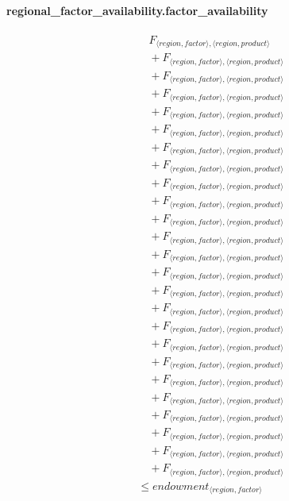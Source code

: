 \documentclass[11pt]{article}
\begin{document}
\paragraph{regional\_factor\_availability.factor\_availability}
\begin{align*}
&\quad F_{\langle region, factor\rangle,\langle region, product\rangle}\\
&\quad {}+ F_{\langle region, factor\rangle,\langle region, product\rangle}\\
&\quad {}+ F_{\langle region, factor\rangle,\langle region, product\rangle}\\
&\quad {}+ F_{\langle region, factor\rangle,\langle region, product\rangle}\\
&\quad {}+ F_{\langle region, factor\rangle,\langle region, product\rangle}\\
&\quad {}+ F_{\langle region, factor\rangle,\langle region, product\rangle}\\
&\quad {}+ F_{\langle region, factor\rangle,\langle region, product\rangle}\\
&\quad {}+ F_{\langle region, factor\rangle,\langle region, product\rangle}\\
&\quad {}+ F_{\langle region, factor\rangle,\langle region, product\rangle}\\
&\quad {}+ F_{\langle region, factor\rangle,\langle region, product\rangle}\\
&\quad {}+ F_{\langle region, factor\rangle,\langle region, product\rangle}\\
&\quad {}+ F_{\langle region, factor\rangle,\langle region, product\rangle}\\
&\quad {}+ F_{\langle region, factor\rangle,\langle region, product\rangle}\\
&\quad {}+ F_{\langle region, factor\rangle,\langle region, product\rangle}\\
&\quad {}+ F_{\langle region, factor\rangle,\langle region, product\rangle}\\
&\quad {}+ F_{\langle region, factor\rangle,\langle region, product\rangle}\\
&\quad {}+ F_{\langle region, factor\rangle,\langle region, product\rangle}\\
&\quad {}+ F_{\langle region, factor\rangle,\langle region, product\rangle}\\
&\quad {}+ F_{\langle region, factor\rangle,\langle region, product\rangle}\\
&\quad {}+ F_{\langle region, factor\rangle,\langle region, product\rangle}\\
&\quad {}+ F_{\langle region, factor\rangle,\langle region, product\rangle}\\
&\quad {}+ F_{\langle region, factor\rangle,\langle region, product\rangle}\\
&\quad {}+ F_{\langle region, factor\rangle,\langle region, product\rangle}\\
&\quad {}+ F_{\langle region, factor\rangle,\langle region, product\rangle}\\
&\quad {}+ F_{\langle region, factor\rangle,\langle region, product\rangle}\\
&\le endowment_{\langle region, factor\rangle}
\end{align*}
\end{document}

